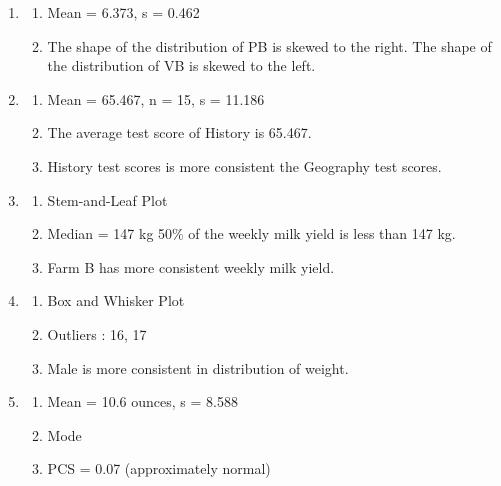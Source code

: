 \documentclass[
  a4paper,
  DIV=11,
  numbers=noendperiod,
  oneside]{scrreprt}
\providecommand{\tightlist}{%
  \setlength{\itemsep}{0pt}\setlength{\parskip}{0pt}}\usepackage{longtable,booktabs,array}
\begin{document}
\begin{enumerate}
\def\labelenumi{\arabic{enumi}.}
\setcounter{enumi}{1}
\item
  \begin{enumerate}
  \def\labelenumii{\alph{enumii})}
  \tightlist
  \item
    Mean = 6.373, s = 0.462
  \item
    The shape of the distribution of PB is skewed to the right. The
    shape of the distribution of VB is skewed to the left.
  \end{enumerate}
\item
  \begin{enumerate}
  \def\labelenumii{\alph{enumii})}
  \tightlist
  \item
    Mean = 65.467, n = 15, s = 11.186
  \item
    The average test score of History is 65.467.
  \item
    History test scores is more consistent the Geography test scores.
  \end{enumerate}
\item
  \begin{enumerate}
  \def\labelenumii{\alph{enumii})}
  \tightlist
  \item
    Stem-and-Leaf Plot
  \item
    Median = 147 kg 50\% of the weekly milk yield is less than 147 kg.
  \item
    Farm B has more consistent weekly milk yield.
  \end{enumerate}
\item
  \begin{enumerate}
  \def\labelenumii{\alph{enumii})}
  \tightlist
  \item
    Box and Whisker Plot
  \item
    Outliers : 16, 17
  \item
    Male is more consistent in distribution of weight.
  \end{enumerate}
\item
  \begin{enumerate}
  \def\labelenumii{\alph{enumii})}
  \tightlist
  \item
    Mean = 10.6 ounces, s = 8.588
  \item
    Mode
  \item
    PCS = 0.07 (approximately normal)
  \end{enumerate}
\end{enumerate}

\end{document}
